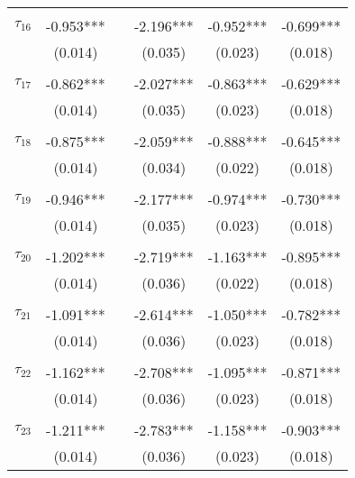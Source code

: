 \begin{tabular}{@{\extracolsep{-5pt}}lccccc}
                &           &&           &           &           \\[-2.1ex]
$\tau_{16}$     & -0.953*** && -2.196*** & -0.952*** & -0.699*** \\
                &  (0.014)  &&  (0.035)  &  (0.023)  &  (0.018)  \\
                &           &&           &           &           \\[-2.1ex]
$\tau_{17}$     & -0.862*** && -2.027*** & -0.863*** & -0.629*** \\
                &  (0.014)  &&  (0.035)  &  (0.023)  &  (0.018)  \\
                &           &&           &           &           \\[-2.1ex]
$\tau_{18}$     & -0.875*** && -2.059*** & -0.888*** & -0.645*** \\
                &  (0.014)  &&  (0.034)  &  (0.022)  &  (0.018)  \\
                &           &&           &           &           \\[-2.1ex]
$\tau_{19}$     & -0.946*** && -2.177*** & -0.974*** & -0.730*** \\
                &  (0.014)  &&  (0.035)  &  (0.023)  &  (0.018)  \\
                &           &&           &           &           \\[-2.1ex]
$\tau_{20}$     & -1.202*** && -2.719*** & -1.163*** & -0.895*** \\
                &  (0.014)  &&  (0.036)  &  (0.022)  &  (0.018)  \\
                &           &&           &           &           \\[-2.1ex]
$\tau_{21}$     & -1.091*** && -2.614*** & -1.050*** & -0.782*** \\
                &  (0.014)  &&  (0.036)  &  (0.023)  &  (0.018)  \\
                &           &&           &           &           \\[-2.1ex]
$\tau_{22}$     & -1.162*** && -2.708*** & -1.095*** & -0.871*** \\
                &  (0.014)  &&  (0.036)  &  (0.023)  &  (0.018)  \\
                &           &&           &           &           \\[-2.1ex]
$\tau_{23}$     & -1.211*** && -2.783*** & -1.158*** & -0.903*** \\
                &  (0.014)  &&  (0.036)  &  (0.023)  &  (0.018)  \\

\end{tabular}
